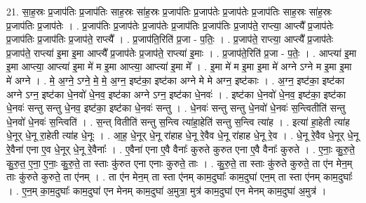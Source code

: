 \documentclass[17pt]{extarticle}
\begin{document}
21. सा॒ह॒स्रः प्र॒जाप॑तिः प्र॒जाप॑तिः साह॒स्रः सा॑ह॒स्रः प्र॒जाप॑तिः प्र॒जाप॑तेः प्र॒जाप॑तेः प्र॒जाप॑तिः साह॒स्रः सा॑ह॒स्रः प्र॒जाप॑तिः प्र॒जाप॑तेः । . प्र॒जाप॑तिः प्र॒जाप॑तेः प्र॒जाप॑तेः प्र॒जाप॑तिः प्र॒जाप॑तिः प्र॒जाप॑ते॒ राप्त्या॒ आप्त्यै᳚ प्र॒जाप॑तेः प्र॒जाप॑तिः प्र॒जाप॑तिः प्र॒जाप॑ते॒ राप्त्यै᳚ । . प्र॒जाप॑ति॒रिति॑ प्र॒जा - प॒तिः॒ । . प्र॒जाप॑ते॒ राप्त्या॒ आप्त्यै᳚ प्र॒जाप॑तेः प्र॒जाप॑ते॒ राप्त्या॑ इ॒मा इ॒मा आप्त्यै᳚ प्र॒जाप॑तेः प्र॒जाप॑ते॒ राप्त्या॑ इ॒माः । . प्र॒जाप॑ते॒रिति॑ प्र॒जा - प॒तेः॒ । . आप्त्या॑ इ॒मा इ॒मा आप्त्या॒ आप्त्या॑ इ॒मा मे॑ म इ॒मा आप्त्या॒ आप्त्या॑ इ॒मा मे᳚ । . इ॒मा मे॑ म इ॒मा इ॒मा मे॑ अग्ने ऽग्ने म इ॒मा इ॒मा मे॑ अग्ने । . मे॒ अ॒ग्ने॒ ऽग्ने॒ मे॒ मे॒ अ॒ग्न॒ इष्ट॑का॒ इष्ट॑का अग्ने मे मे अग्न॒ इष्ट॑काः । . अ॒ग्न॒ इष्ट॑का॒ इष्ट॑का अग्ने ऽग्न॒ इष्ट॑का धे॒नवो॑ धे॒नव॒ इष्ट॑का अग्ने ऽग्न॒ इष्ट॑का धे॒नवः॑ । . इष्ट॑का धे॒नवो॑ धे॒नव॒ इष्ट॑का॒ इष्ट॑का धे॒नवः॑ सन्तु सन्तु धे॒नव॒ इष्ट॑का॒ इष्ट॑का धे॒नवः॑ सन्तु । . धे॒नवः॑ सन्तु सन्तु धे॒नवो॑ धे॒नवः॑ स॒न्त्वितीति॑ सन्तु धे॒नवो॑ धे॒नवः॑ स॒न्त्विति॑ । . स॒न्त् वितीति॑ सन्तु स॒न्त्वि त्या॑हा॒हेति॑ सन्तु स॒न्त्वि त्या॑ह । . इत्या॑ हा॒हेती त्या॑ह धे॒नूर् धे॒नू रा॒हेती त्या॑ह धे॒नूः । . आ॒ह॒ धे॒नूर् धे॒नू रा॑हाह धे॒नू रे॒वैव धे॒नू रा॑हाह धे॒नू रे॒व । . धे॒नू रे॒वैव धे॒नूर् धे॒नू रे॒वैना॑ एना ए॒व धे॒नूर् धे॒नू रे॒वैनाः᳚ । . ए॒वैना॑ एना ए॒वै वैनाः᳚ कुरुते कुरुत एना ए॒वै वैनाः᳚ कुरुते । . ए॒नाः॒ कु॒रु॒ते॒ कु॒रु॒त॒ ए॒ना॒ ए॒नाः॒ कु॒रु॒ते॒ ता स्ताः कु॑रुत एना एनाः कुरुते॒ ताः । . कु॒रु॒ते॒ ता स्ताः कु॑रुते कुरुते॒ ता ए॑न मेन॒म् ताः कु॑रुते कुरुते॒ ता ए॑नम् । . ता ए॑न मेन॒म् ता स्ता ए॑नम् काम॒दुघाः᳚ काम॒दुघा॑ एन॒म् ता स्ता ए॑नम् काम॒दुघाः᳚ । . ए॒न॒म् का॒म॒दुघाः᳚ काम॒दुघा॑ एन मेनम् काम॒दुघा॑ अ॒मुत्रा॒ मुत्र॑ काम॒दुघा॑ एन मेनम् काम॒दुघा॑ अ॒मुत्र॑ । \newline
\end{document}
